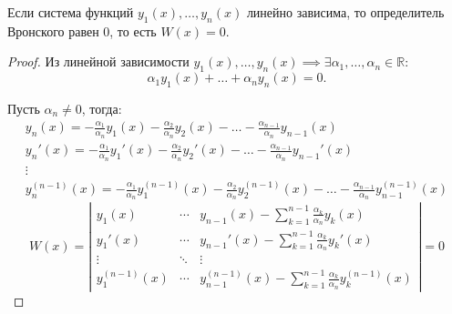 \begin{theorem}
    Если система функций $y_1(x), \ldots, y_n(x)$ линейно зависима, то определитель Вронского равен $0$, то есть $W(x) = 0$.
\end{theorem}

\begin{proof}
    Из линейной зависимости $y_1(x),\ldots,y_n(x) \implies \exists \alpha_1,\ldots,\alpha_n \in \mathbb{R}$:
    \[
        \alpha_1y_1(x) + \ldots + \alpha_ny_n(x) = 0.
    \]

    Пусть $\alpha_n \ne 0$, тогда:
    \[
        \begin{array}{l}
            y_n(x) = -\frac{\alpha_1}{\alpha_n}y_1(x) - \frac{\alpha_2}{\alpha_n}y_2(x) - \ldots - \frac{\alpha_{n-1}}{\alpha_n}y_{n-1}(x)     \\
            y_n'(x) = -\frac{\alpha_1}{\alpha_n}y_1'(x) - \frac{\alpha_2}{\alpha_n}y_2'(x) - \ldots - \frac{\alpha_{n-1}}{\alpha_n}y_{n-1}'(x) \\
            \vdots                                                                                                                             \\
            y_n^{(n-1)}(x) = -\frac{\alpha_1}{\alpha_n}y_1^{(n-1)}(x) - \frac{\alpha_2}{\alpha_n}y_2^{(n-1)}(x) - \ldots - \frac{\alpha_{n-1}}{\alpha_n}y_{n-1}^{(n-1)}(x)
        \end{array}
    \]
    \[
        W(x) = \left|\begin{array}{ccc}
            y_1(x)         & \cdots & y_{n-1}(x) - \sum_{k=1}^{n-1}\frac{\alpha_k}{\alpha_n}y_k(x)                 \\
            y_1'(x)        & \cdots & y_{n-1}'(x) - \sum_{k=1}^{n-1}\frac{\alpha_k}{\alpha_n}y_k'(x)               \\
            \vdots         & \ddots & \vdots                                                                       \\
            y_1^{(n-1)}(x) & \cdots & y_{n-1}^{(n-1)}(x) - \sum_{k=1}^{n-1}\frac{\alpha_k}{\alpha_n}y_k^{(n-1)}(x)
        \end{array}\right| = 0
    \]
\end{proof}

